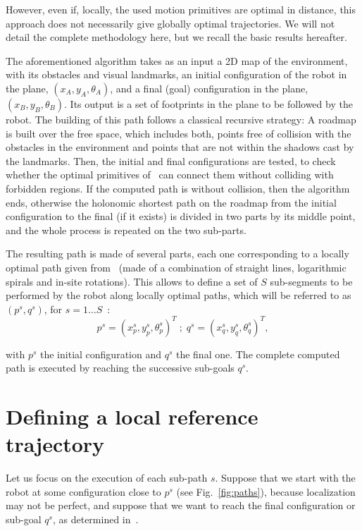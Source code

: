 However, even if, locally, the used motion primitives are optimal in distance, this approach does not necessarily give globally optimal trajectories. We will not detail the complete methodology here, but we recall the basic results hereafter.

The aforementioned algorithm takes as an input a 2D map of the environment, with its obstacles and visual landmarks, an initial configuration of the robot in the plane, $(x_A,y_A,\theta_A)$, and a final (goal) configuration in the plane, $(x_B,y_B,\theta_B)$. Its output is a set of footprints in the plane to be followed by the robot. The building of this path follows a classical recursive strategy: A roadmap is built over the free space, which includes both, points free of collision with the obstacles in the environment and points that are not within the shadows cast by the landmarks. Then, the initial and final configurations are tested, to check whether the optimal primitives of~\citep{Salaris:2010} can connect them without colliding with forbidden regions. If the computed path is without collision, then the algorithm ends, otherwise the holonomic shortest path on the roadmap from the initial configuration to the final (if it exists) is divided in two parts by its middle point, and the whole process is repeated on the two sub-parts. 

The resulting path is made of several parts, each one corresponding to a locally optimal path given from~\citep{Salaris:2010} (made of a combination of straight lines, logarithmic spirals and in-site rotations). This allows to define a set of $S$ sub-segments to be performed by the robot along locally optimal paths, which will be referred to as $(p^s,q^s)$, for $s=1\dots S$~:
$$
p^s = (x_p^s,y_p^s,\theta_p^s)^T \; ; \; q^s = (x_q^s,y_q^s,\theta_q^s)^T,
$$

\noindent with $p^s$ the initial configuration and $q^s$ the final one. The complete computed path is executed by reaching the successive sub-goals $q^s$.


\section{Defining a local reference trajectory}

\label{sec:reftrajectories}

Let us focus on the execution of each sub-path $s$. Suppose that we start with the robot at some configuration close to $p^s$ (see Fig.~\ref{fig:paths}), because localization may not be perfect, and suppose that we want to reach the final configuration or sub-goal $q^s$, as determined in~\citep{jib-IJHR2010}.

